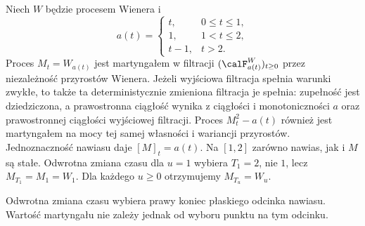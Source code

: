 \begin{przyklad}
Niech $W$ będzie procesem Wienera i
\[
a(t)=\begin{cases}
t,&0\le t\le1,\\
1,&1<t\le2,\\
t-1,&t>2.
\end{cases}
\]
Proces $M_t=W_{a(t)}$ jest martyngałem
w filtracji $(\calF^W_{a(t)})_{t\ge0}$
przez niezależność przyrostów Wienera.
Jeżeli wyjściowa filtracja spełnia warunki zwykłe,
to także ta deterministycznie zmieniona filtracja
je spełnia: zupełność jest dziedziczona,
a prawostronna ciągłość wynika z ciągłości
i monotoniczności $a$ oraz prawostronnej
ciągłości wyjściowej filtracji. Proces $M_t^2-a(t)$
również jest martyngałem na mocy tej samej
własności i wariancji przyrostów.
Jednoznaczność nawiasu daje $[M]_t=a(t)$.
Na $[1,2]$ zarówno nawias, jak i $M$
są stałe. Odwrotna zmiana czasu dla $u=1$
wybiera $T_1=2$, nie $1$, lecz
$M_{T_1}=M_1=W_1$. Dla każdego $u\ge0$
otrzymujemy $M_{T_u}=W_u$.
\end{przyklad}

\begin{center}
\par\smallskip\small Odwrotna zmiana czasu wybiera prawy
koniec płaskiego odcinka nawiasu. Wartość martyngału
nie zależy jednak od wyboru punktu na tym odcinku.
\end{center}

